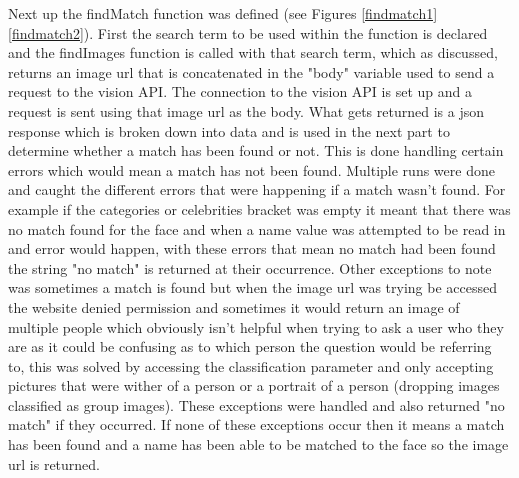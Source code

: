 \documentclass[12pt,a4paper]{article}
\begin{document}
Next up the findMatch function was defined (see Figures \ref{findmatch1} \ref{findmatch2}). First the search term to be used within the function is declared and the findImages function is called with that search term, which as discussed, returns an image url that is concatenated in the "body" variable used to send a request to the vision API. The connection to the vision API is set up and a request is sent using that image url as the body. What gets returned is a json response which is broken down into data and is used in the next part to determine whether a match has been found or not. This is done handling certain errors which would mean a match has not been found. Multiple runs were done and caught the different errors that were happening if a match wasn't found. For example if the categories or celebrities bracket was empty it meant that there was no match found for the face and when a name value was attempted to be read in and error would happen, with these errors that mean no match had been found the string "no match" is returned at their occurrence. Other exceptions to note was sometimes a match is found but when the image url was trying be accessed the website denied permission and sometimes it would return an image of multiple people which obviously isn't helpful when trying to ask a user who they are as it could be confusing as to which person the question would be referring to, this was solved by accessing the classification parameter and only accepting pictures that were wither of a person or a portrait of a person (dropping images classified as group images). These exceptions were handled and also returned "no match" if they occurred. If none of these exceptions occur then it means a match has been found and a name has been able to be matched to the face so the image url is returned.
\end{document}
